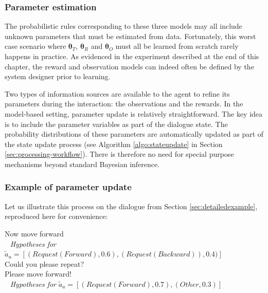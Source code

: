 \subsubsection*{Parameter estimation}
The probabilistic rules corresponding to these three models may all include unknown parameters that must be estimated from data.  Fortunately, this worst case scenario where $\boldsymbol\theta_T$, $\boldsymbol\theta_R$ and $\boldsymbol\theta_O$ must all be learned from scratch rarely happens in practice. As evidenced in the experiment described at the end of this chapter, the reward and observation models can indeed often be defined by the system designer prior to learning. 

Two types of information sources are available to the agent to refine its parameters during the interaction: the observations and the rewards.  In the model-based setting, parameter update is relatively straightforward.  The key idea is to include the parameter variables as part of the dialogue state.  The probability distributions of these parameters are automatically updated as part of the state update process (see Algorithm \ref{algo:stateupdate} in Section \ref{sec:processing-workflow}). There is therefore no need for special purpose mechanisms beyond standard Bayesian inference.

\subsubsection*{Example of parameter update}

Let us illustrate this process on the dialogue from Section \ref{sec:detailedexample}, reproduced here for convenience: \vspace{-2mm}
\begin{dialogue} 
 Now move forward \\  $\phantom{b}$ \textit{Hypotheses for} $\tilde{a}_u = [ (\mathit{Request(Forward)}, 0.6), (\mathit{Request(Backward)}), 0.4)]$  \\[-3mm]
 Could you please repeat? \\[-3mm]
 Please move forward! \\  $\phantom{b}$ \textit{Hypotheses for} $\tilde{a}_u = [ (\mathit{Request(Forward)}, 0.7), (\mathit{Other}, 0.3) ]$ \\[-4mm]
\end{dialogue} 

